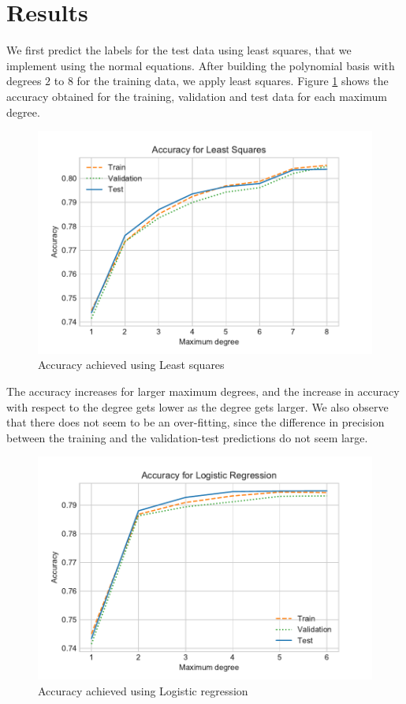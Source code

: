 \documentclass[10pt,conference,compsocconf]{IEEEtran}
\begin{document}
\section{Results}
\label{sec:results}
    We first predict the labels for the test data using least squares, that we implement using the normal equations. After building the polynomial basis with degrees $2$ to $8$ for the training data, we apply least squares. Figure \ref{fig:LSprec} shows the accuracy obtained for the training, validation and test data for each maximum degree.

    \begin{figure}[htp]
      \centering
      \includegraphics[width=.45\textwidth,trim={0 .3cm 0 .7cm},clip]{LSprec}
      \caption{Accuracy achieved using Least squares}
      \label{fig:LSprec}
    \end{figure}


    The accuracy increases for larger maximum degrees, and the increase in accuracy with respect to the degree gets lower as the degree gets larger. We also observe that there does not seem to be an over-fitting, since the difference in precision between the training and the validation-test predictions do not seem large.

    \begin{figure}[htp]
      \centering
      \includegraphics[width=.45\textwidth,trim={0 .3cm 0 .7cm},clip]{LRprec}
      \caption{Accuracy achieved using Logistic regression}
      \label{fig:LRprec}
    \end{figure}
\end{document}
